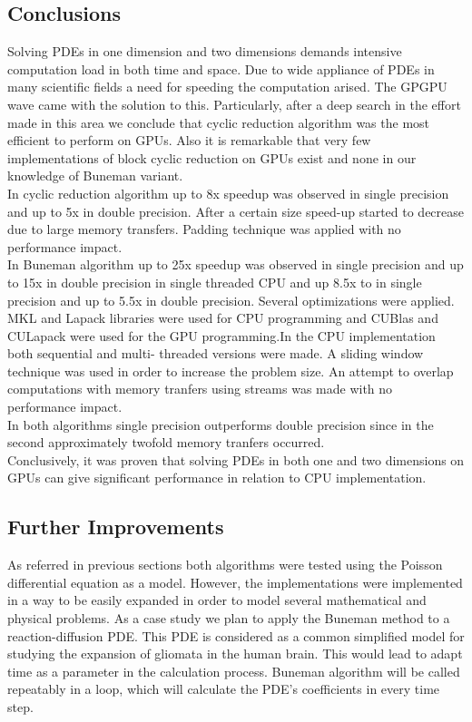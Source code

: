 \subsection{Conclusions}
Solving PDEs in one dimension and two dimensions demands intensive computation load in both time and space.
Due to wide appliance of PDEs in many scientific fields a need for speeding the computation arised. The GPGPU
wave came with the solution to this.
Particularly, after a deep search in the effort made in this area we conclude that cyclic reduction algorithm 
was the most efficient to perform on GPUs. Also it is remarkable that very few implementations of block cyclic reduction on GPUs  exist and none in our knowledge of Buneman variant.\\
In cyclic reduction algorithm up to 8x speedup was observed in single precision and up to 5x in double precision.
After a certain size speed-up started to decrease due to large memory transfers. Padding technique was applied with
no performance impact.\\
In Buneman algorithm up to 25x speedup was observed in single precision and up to 15x in double precision in single
threaded CPU and up 8.5x to in single precision and up to 5.5x in double precision. Several optimizations were applied. MKL and Lapack libraries were used for CPU programming and CUBlas and CULapack were used for the GPU programming.In the CPU implementation both sequential and multi- threaded versions were made. A sliding window technique was used in order to increase the problem size. An attempt to overlap computations with memory tranfers using streams was made with no performance impact.\\
In both algorithms single precision outperforms double precision since in the second approximately twofold memory 
tranfers occurred.\\
Conclusively, it was proven that solving PDEs in both one and two dimensions on GPUs can give significant performance
in relation to CPU implementation. 
\subsection{Further Improvements}
As referred in previous sections both algorithms were tested using the Poisson differential equation 
as a model. However, the implementations were implemented in a way to be easily expanded in order to model 
several mathematical and physical problems.  
As a case study we plan to apply the Buneman method to a reaction-diffusion PDE.  This PDE is considered as a common simplified model for studying the expansion of gliomata in the human brain. This would lead to adapt time as a parameter in the calculation process. Buneman algorithm will be called repeatably in a loop, which will calculate the
PDE's coefficients in every time step.